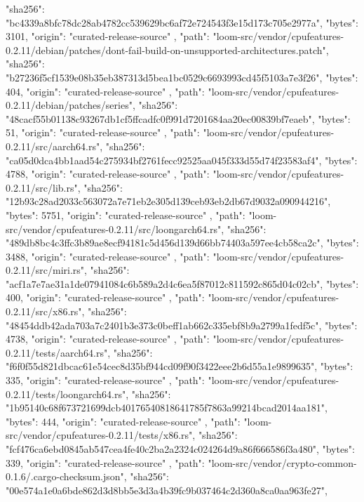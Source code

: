 {{      "sha256": "bc4339a8bfc78dc28ab4782cc539629bc6af72e724543f3e15d173c705e2977a",
      "bytes": 3101,
      "origin": "curated-release-source"
    },
    {
      "path": "loom-src/vendor/cpufeatures-0.2.11/debian/patches/dont-fail-build-on-unsupported-architectures.patch",
      "sha256": "b27236f5cf1539e08b35eb387313d5bea1bc0529c6693993cd45f5103a7e3f26",
      "bytes": 404,
      "origin": "curated-release-source"
    },
    {
      "path": "loom-src/vendor/cpufeatures-0.2.11/debian/patches/series",
      "sha256": "48cacf55b01138c93267db1cf5ffcadfc0f991d7201684aa20ec00839bf7eaeb",
      "bytes": 51,
      "origin": "curated-release-source"
    },
    {
      "path": "loom-src/vendor/cpufeatures-0.2.11/src/aarch64.rs",
      "sha256": "ca05d0dca4bb1aad54c275934bf2761fecc92525aa045f333d55d74f23583af4",
      "bytes": 4788,
      "origin": "curated-release-source"
    },
    {
      "path": "loom-src/vendor/cpufeatures-0.2.11/src/lib.rs",
      "sha256": "12b93c28ad2033c563072a7e71eb2e305d139ceb93eb2db67d9032a090944216",
      "bytes": 5751,
      "origin": "curated-release-source"
    },
    {
      "path": "loom-src/vendor/cpufeatures-0.2.11/src/loongarch64.rs",
      "sha256": "489db8bc4c3ffc3b89ae8ecf94181c5d456d139d66bb74403a597ee4cb58ca2c",
      "bytes": 3488,
      "origin": "curated-release-source"
    },
    {
      "path": "loom-src/vendor/cpufeatures-0.2.11/src/miri.rs",
      "sha256": "acf1a7e7ae31a1de07941084c6b589a2d4c6ea5f87012c811592c865d04c02cb",
      "bytes": 400,
      "origin": "curated-release-source"
    },
    {
      "path": "loom-src/vendor/cpufeatures-0.2.11/src/x86.rs",
      "sha256": "48454ddb42ada703a7c2401b3e373c0beff1ab662c335ebf8b9a2799a1fedf5c",
      "bytes": 4738,
      "origin": "curated-release-source"
    },
    {
      "path": "loom-src/vendor/cpufeatures-0.2.11/tests/aarch64.rs",
      "sha256": "f6f0f55d821dbcac61e54cec8d35bf944cd09f90f3422eee2b6d55a1e9899635",
      "bytes": 335,
      "origin": "curated-release-source"
    },
    {
      "path": "loom-src/vendor/cpufeatures-0.2.11/tests/loongarch64.rs",
      "sha256": "1b95140c68f673721699dcb40176540818641785f7863a99214bcad2014aa181",
      "bytes": 444,
      "origin": "curated-release-source"
    },
    {
      "path": "loom-src/vendor/cpufeatures-0.2.11/tests/x86.rs",
      "sha256": "fcf476ca6ebd0845ab547cea4fe40c2ba2a2324c024264d9a86f666586f3a480",
      "bytes": 339,
      "origin": "curated-release-source"
    },
    {
      "path": "loom-src/vendor/crypto-common-0.1.6/.cargo-checksum.json",
      "sha256": "00e574a1e0a6bde862d3d8bb5e3d3a4b39fc9b037464c2d360a8ca0aa963fe27",
}}
